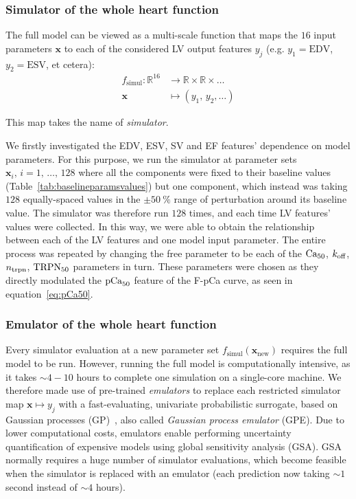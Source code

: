 %
%
%
\subsubsection{Simulator of the whole heart function}
The full model can be viewed as a multi-scale function that maps the $16$ input parameters $\mathbf{x}$ to each of the considered LV output features $y_j$ (e.g. $y_1=\textrm{EDV}$, $y_2=\textrm{ESV}$, et cetera):
%
\begin{align}\label{eq:fsimul}
    f_{\textrm{simul}}\colon\mathbb{R}^{16} &\to\mathbb{R}\times\mathbb{R}\times\dots \\
    \mathbf{x} &\mapsto (y_1,\,y_2,\dots) \nonumber
\end{align}

This map takes the name of \textit{simulator}.

\vspace{0.2cm}
We firstly investigated the EDV, ESV, SV and EF features' dependence on model parameters. For this purpose, we run the simulator at parameter sets $\mathbf{x}_i,\,i=1,\,\dots,\,128$ where all the components were fixed to their baseline values (Table~\ref{tab:baselineparamsvalues}) but one component, which instead was taking $128$ equally-spaced values in the $\pm\SI{50}{\percent}$ range of perturbation around its baseline value. The simulator was therefore run $128$ times, and each time LV features' values were collected. In this way, we were able to obtain the relationship between each of the LV features and one model input parameter. The entire process was repeated by changing the free parameter to be each of the $\textrm{Ca}_{50}$, $k_{\textrm{off}}$, $n_{\textrm{trpn}}$, $\textrm{TRPN}_{50}$ parameters in turn. These parameters were chosen as they directly modulated the $\textrm{pCa}_{50}$ feature of the F-pCa curve, as seen in equation~\eqref{eq:pCa50}.


%
%
%
\subsubsection{Emulator of the whole heart function}
Every simulator evaluation at a new parameter set $f_{\textrm{simul}}(\mathbf{x}_{\textrm{new}})$ requires the full model to be run. However, running the full model is computationally intensive, as it takes $\sim 4-10$ hours to complete one simulation on a single-core machine. We therefore made use of pre-trained \textit{emulators} to replace each restricted simulator map $\mathbf{x}\mapsto y_j$ with a fast-evaluating, univariate probabilistic surrogate, based on Gaussian processes (GP)~\cite{Longobardi:2020}, also called \textit{Gaussian process emulator} (GPE). Due to lower computational costs, emulators enable performing uncertainty quantification of expensive models using global sensitivity analysis (GSA). GSA normally requires a huge number of simulator evaluations, which become feasible when the simulator is replaced with an emulator (each prediction now taking $\sim 1$ second instead of $\sim 4$ hours).

